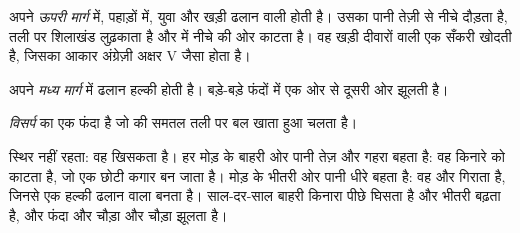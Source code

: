 अपने \emph{ऊपरी मार्ग} में, पहाड़ों में,  युवा और खड़ी ढलान वाली होती है। उसका
पानी तेज़ी से नीचे दौड़ता है, तली पर शिलाखंड लुढ़काता है और  में नीचे की
ओर काटता है। वह खड़ी दीवारों वाली एक सँकरी  खोदती है, जिसका आकार अंग्रेज़ी
अक्षर V जैसा होता है।

अपने \emph{मध्य मार्ग} में ढलान हल्की होती है।  बड़े-बड़े फंदों में एक ओर से
दूसरी ओर झूलती है।

\begin{definition}[विसर्प]\label{def:g5:water-shapes-the-land:meander}
\emph{विसर्प}  का एक फंदा है जो  की समतल तली पर बल खाता
हुआ चलता है।
\end{definition}

 स्थिर नहीं रहता: वह खिसकता है। हर मोड़ के बाहरी ओर पानी तेज़ और गहरा
बहता है: वह किनारे को काटता है, जो एक छोटी कगार बन जाता है। मोड़ के भीतरी ओर
पानी धीरे बहता है: वह  और  गिराता है, जिनसे एक हल्की ढलान वाला  बनता
है। साल-दर-साल बाहरी किनारा पीछे घिसता है और भीतरी  बढ़ता है, और फंदा और
चौड़ा और चौड़ा झूलता है।

